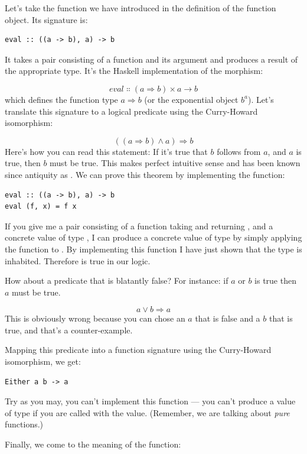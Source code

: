 Let's take the function  we have introduced in the
definition of the function object. Its signature is:

\begin{Verbatim}
eval :: ((a -> b), a) -> b
\end{Verbatim}
It takes a pair consisting of a function and its argument and produces a
result of the appropriate type. It's the Haskell implementation of the
morphism:

\[eval \Colon (a \Rightarrow b) \times a \to b\]
which defines the function type $a \Rightarrow b$ (or the exponential object
$b^{a}$). Let's translate this signature to a logical predicate
using the Curry-Howard isomorphism:

\[((a \Rightarrow b) \wedge a) \Rightarrow b\]
Here's how you can read this statement: If it's true that $b$
follows from $a$, and $a$ is true, then $b$ must be
true. This makes perfect intuitive sense and has been known since
antiquity as . We can prove this theorem by
implementing the function:

\begin{Verbatim}
eval :: ((a -> b), a) -> b
eval (f, x) = f x
\end{Verbatim}
If you give me a pair consisting of a function  taking
 and returning , and a concrete value  of
type , I can produce a concrete value of type  by
simply applying the function  to . By implementing
this function I have just shown that the type
 is inhabited.
Therefore  is true in our logic.

How about a predicate that is blatantly false? For instance: if
$a$ or $b$ is true then $a$ must be true.

\[a \vee b \Rightarrow a\]
This is obviously wrong because you can chose an $a$ that is
false and a $b$ that is true, and that's a counter-example.

Mapping this predicate into a function signature using the Curry-Howard
isomorphism, we get:

\begin{Verbatim}
Either a b -> a
\end{Verbatim}
Try as you may, you can't implement this function --- you can't produce
a value of type  if you are called with the 
value. (Remember, we are talking about \emph{pure} functions.)

Finally, we come to the meaning of the  function:

